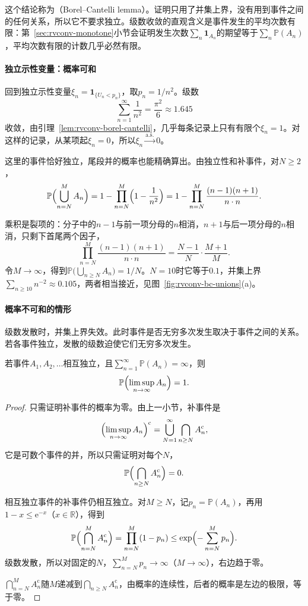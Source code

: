 这个结论称为（Borel–Cantelli lemma）。证明只用了并集上界，没有用到事件之间的任何关系，所以它不要求独立。级数收敛的直观含义是事件发生的平均次数有限：第~\ref{sec:rvconv-monotone}小节会证明发生次数$\sum_n\mathbf{1}_{A_n}$的期望等于$\sum_n\mathbb{P}(A_n)$，平均次数有限的计数几乎必然有限。

\paragraph{独立示性变量：概率可和}
回到独立示性变量$\xi_n=\mathbf{1}_{\{U_n<p_n\}}$，取$p_n=1/n^{2}$。级数
\[
 \sum_{n=1}^{\infty}\frac{1}{n^{2}}=\frac{\pi^{2}}{6}\approx1.645
\]
收敛，由引理~\ref{lem:rvconv-borel-cantelli}，几乎每条记录上只有有限个$\xi_n=1$。对这样的记录，从某项起$\xi_n=0$，所以$\xi_n\xrightarrow{\mathrm{a.s.}}0$。

这里的事件恰好独立，尾段并的概率也能精确算出。由独立性和补事件，对$N\geq2$，
\[
 \mathbb{P}\Bigl(\bigcup_{n=N}^{M}A_n\Bigr)=1-\prod_{n=N}^{M}\Bigl(1-\frac{1}{n^{2}}\Bigr)=1-\prod_{n=N}^{M}\frac{(n-1)(n+1)}{n\cdot n} .
\]

乘积是裂项的：分子中的$n-1$与前一项分母的$n$相消，$n+1$与后一项分母的$n$相消，只剩下首尾两个因子，
\[
 \prod_{n=N}^{M}\frac{(n-1)(n+1)}{n\cdot n}=\frac{N-1}{N}\cdot\frac{M+1}{M} .
\]
令$M\to\infty$，得到$\mathbb{P}\bigl(\bigcup_{n\geq N}A_n\bigr)=1/N$。$N=10$时它等于$0.1$，并集上界$\sum_{n\geq10}n^{-2}\approx0.105$，两者相当接近，见图~\ref{fig:rvconv-bc-unions}(a)。

\paragraph{概率不可和的情形}
级数发散时，并集上界失效。此时事件是否无穷多次发生取决于事件之间的关系。若各事件独立，发散的级数迫使它们无穷多次发生。

\begin{lemma}
\label{lem:rvconv-borel-cantelli-2}
若事件$A_1,A_2,\dots$相互独立，且$\sum_{n=1}^{\infty}\mathbb{P}(A_n)=\infty$，则
\begin{equation}
 \mathbb{P}\Bigl(\limsup_{n\to\infty}A_n\Bigr)=1 .
 \label{eq:rvconv-bc2}
\end{equation}
\end{lemma}

\begin{proof}
只需证明补事件的概率为零。由上一小节，补事件是
\[
 \Bigl(\limsup_{n\to\infty}A_n\Bigr)^{\mathrm{c}}=\bigcup_{N=1}^{\infty}\bigcap_{n\geq N}A_n^{\mathrm{c}} ,
\]
它是可数个事件的并，所以只需证明对每个$N$，
\[
 \mathbb{P}\Bigl(\bigcap_{n\geq N}A_n^{\mathrm{c}}\Bigr)=0 .
\]

相互独立事件的补事件仍相互独立。对$M\geq N$，记$p_n=\mathbb{P}(A_n)$，再用$1-x\leq\mathrm{e}^{-x}$（$x\in\mathbb{R}$），得到
\[
 \mathbb{P}\Bigl(\bigcap_{n=N}^{M}A_n^{\mathrm{c}}\Bigr)=\prod_{n=N}^{M}(1-p_n)\leq\exp\Bigl(-\sum_{n=N}^{M}p_n\Bigr) .
\]
级数发散，所以对固定的$N$，$\sum_{n=N}^{M}p_n\to\infty$（$M\to\infty$），右边趋于零。

$\bigcap_{n=N}^{M}A_n^{\mathrm{c}}$随$M$递减到$\bigcap_{n\geq N}A_n^{\mathrm{c}}$，由概率的连续性，后者的概率是左边的极限，等于零。
\end{proof}

